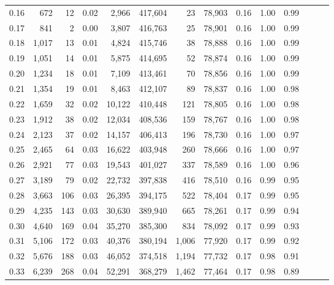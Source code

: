 \begin{tabular}{rrrrrrrrrrrrrr}
0.16 &     672 &     12 &  0.02 &    2,966 &  417,604 &      23 &  78,903 &  0.16 &  1.00 &      0.99 \\
0.17 &     841 &      2 &  0.00 &    3,807 &  416,763 &      25 &  78,901 &  0.16 &  1.00 &      0.99 \\
0.18 &   1,017 &     13 &  0.01 &    4,824 &  415,746 &      38 &  78,888 &  0.16 &  1.00 &      0.99 \\
0.19 &   1,051 &     14 &  0.01 &    5,875 &  414,695 &      52 &  78,874 &  0.16 &  1.00 &      0.99 \\
0.20 &   1,234 &     18 &  0.01 &    7,109 &  413,461 &      70 &  78,856 &  0.16 &  1.00 &      0.99 \\
0.21 &   1,354 &     19 &  0.01 &    8,463 &  412,107 &      89 &  78,837 &  0.16 &  1.00 &      0.98 \\
0.22 &   1,659 &     32 &  0.02 &   10,122 &  410,448 &     121 &  78,805 &  0.16 &  1.00 &      0.98 \\
0.23 &   1,912 &     38 &  0.02 &   12,034 &  408,536 &     159 &  78,767 &  0.16 &  1.00 &      0.98 \\
0.24 &   2,123 &     37 &  0.02 &   14,157 &  406,413 &     196 &  78,730 &  0.16 &  1.00 &      0.97 \\
0.25 &   2,465 &     64 &  0.03 &   16,622 &  403,948 &     260 &  78,666 &  0.16 &  1.00 &      0.97 \\
0.26 &   2,921 &     77 &  0.03 &   19,543 &  401,027 &     337 &  78,589 &  0.16 &  1.00 &      0.96 \\
0.27 &   3,189 &     79 &  0.02 &   22,732 &  397,838 &     416 &  78,510 &  0.16 &  0.99 &      0.95 \\
0.28 &   3,663 &    106 &  0.03 &   26,395 &  394,175 &     522 &  78,404 &  0.17 &  0.99 &      0.95 \\
0.29 &   4,235 &    143 &  0.03 &   30,630 &  389,940 &     665 &  78,261 &  0.17 &  0.99 &      0.94 \\
0.30 &   4,640 &    169 &  0.04 &   35,270 &  385,300 &     834 &  78,092 &  0.17 &  0.99 &      0.93 \\
0.31 &   5,106 &    172 &  0.03 &   40,376 &  380,194 &   1,006 &  77,920 &  0.17 &  0.99 &      0.92 \\
0.32 &   5,676 &    188 &  0.03 &   46,052 &  374,518 &   1,194 &  77,732 &  0.17 &  0.98 &      0.91 \\
0.33 &   6,239 &    268 &  0.04 &   52,291 &  368,279 &   1,462 &  77,464 &  0.17 &  0.98 &      0.89 \\

\end{tabular}
